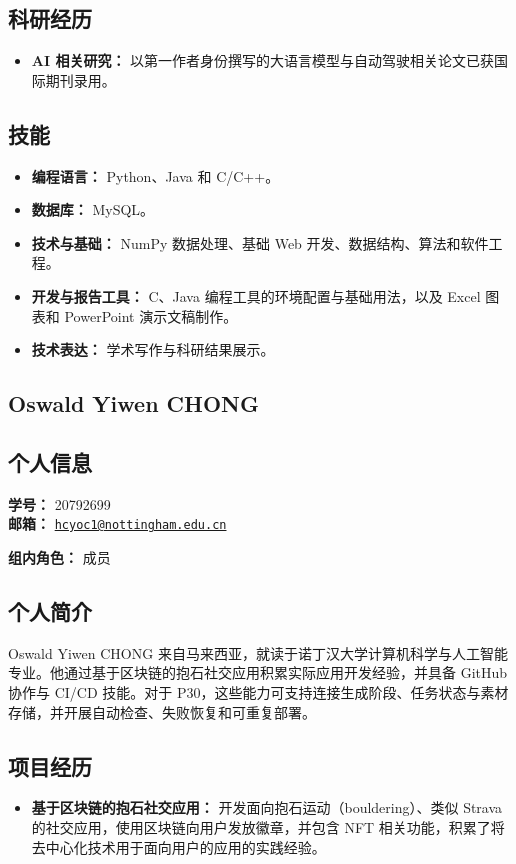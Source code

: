 \documentclass[a4paper,12pt]{article}
\newcommand{\PersonalInformation}[2]{%
  \subsection*{个人信息}
  \if\relax\detokenize{#1}\relax\else
  \noindent\textbf{学号：} #1\\
  \fi
  \textbf{邮箱：} #2\par
}
\begin{document}
\subsection*{科研经历}
\begin{itemize}
  \item \textbf{AI 相关研究：} 以第一作者身份撰写的大语言模型与自动驾驶相关论文已获国际期刊录用。
\end{itemize}

\subsection*{技能}
\begin{itemize}
  \item \textbf{编程语言：} Python、Java 和 C/C++。
  \item \textbf{数据库：} MySQL。
  \item \textbf{技术与基础：} NumPy 数据处理、基础 Web 开发、数据结构、算法和软件工程。
  \item \textbf{开发与报告工具：} C、Java 编程工具的环境配置与基础用法，以及 Excel 图表和 PowerPoint 演示文稿制作。
  \item \textbf{技术表达：} 学术写作与科研结果展示。
\end{itemize}

\subsection{Oswald Yiwen CHONG}
\PersonalInformation{20792699}{\href{mailto:hcyoc1@nottingham.edu.cn}{\nolinkurl{hcyoc1@nottingham.edu.cn}}}
\noindent\textbf{组内角色：} 成员\par

\subsection*{个人简介}
Oswald Yiwen CHONG 来自马来西亚，就读于诺丁汉大学计算机科学与人工智能专业。他通过基于区块链的抱石社交应用积累实际应用开发经验，并具备 GitHub 协作与 CI/CD 技能。对于 P30，这些能力可支持连接生成阶段、任务状态与素材存储，并开展自动检查、失败恢复和可重复部署。

\subsection*{项目经历}
\begin{itemize}
  \item \textbf{基于区块链的抱石社交应用：} 开发面向抱石运动（bouldering）、类似 Strava 的社交应用，使用区块链向用户发放徽章，并包含 NFT 相关功能，积累了将去中心化技术用于面向用户的应用的实践经验。
\end{itemize}
\end{document}

